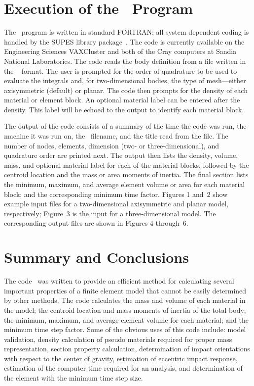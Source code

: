 \chapter{Execution of the \NUM\ Program} The \NUM\ program is written
in standard FORTRAN; all system dependent coding is handled by the
SUPES library package~\cite{supes}.  The code is currently available
on the Engineering Sciences VAXCluster and both of the Cray computers
at Sandia National Laboratories.  The code reads the body definition
from a file written in the \EXO~\cite{EXODUS} format. The user is
prompted for the order of quadrature to be used to evaluate the
integrals and, for two-dimensional bodies, the type of mesh---either
axisymmetric (default) or planar.  The code then prompts for the
density of each material or element block. An optional material label
can be entered after the density. This label will be echoed to the
output to identify each material block. 

The output of the code consists of a summary of the time the code was
run, the machine it was run on, the \EXO\ filename, and the title read
from the file. The number of nodes, elements, dimension (two- or
three-dimensional), and quadrature order are printed next. The output
then lists the density, volume, mass, and optional material label for
each of the material blocks, followed by the centroid location and the
mass or area moments of inertia.  The final section lists the minimum,
maximum, and average element volume or area for each material block;
and the corresponding minimum time factor. Figures 1 and~2 show
example input files for a two-dimensional axisymmetric and planar
model, respectively; Figure~3 is the input for a three-dimensional
model.  The corresponding output files are shown in Figures 4
through~6. 

%
%

\chapter{Summary and Conclusions} The code \NUM\ was written to
provide an efficient method for calculating several important
properties of a finite element model that cannot be easily determined
by other methods.  The code calculates the mass and volume of each
material in the model; the centroid location and mass moments of
inertia of the total body; the minimum, maximum, and average element
volume for each material; and the minimum time step factor. Some of
the obvious uses of this code include: model validation, density
calculation of pseudo materials required for proper mass
representation, section property calculation, determination of impact
orientations with respect to the center of gravity, estimation of
eccentric impact response, estimation of the computer time
required for an analysis, and determination of the element with the
minimum time step size.

